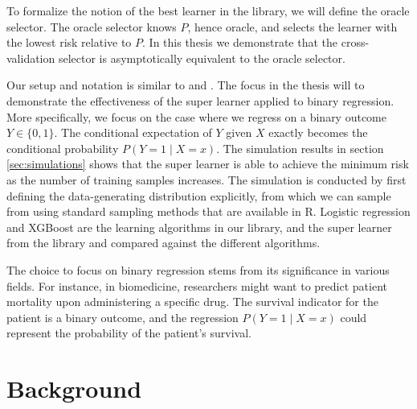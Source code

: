 \documentclass[11pt, a4paper]{article}
\theoremstyle{definition}
\theoremstyle{remark}
\begin{document}
To formalize the notion of the best learner in the library, we will define the oracle selector. The oracle selector knows $ P $, hence oracle, and selects the learner with the lowest risk relative to $ P $. In this thesis we demonstrate that the cross-validation selector is asymptotically equivalent to the oracle selector. 

Our setup and notation is similar to \cite{vaart06} and \cite{laan03}. The focus in the thesis will to demonstrate the effectiveness of the super learner applied to binary regression. More specifically, we focus on the case where we regress on a binary outcome $ Y \in \{0,1\} $. The conditional expectation of $ Y $ given $ X $ exactly becomes the conditional probability $ P(Y = 1 \mid X = x) $. The simulation results in section \ref{sec:simulations} shows that the super learner is able to achieve the minimum risk as the number of training samples increases. The simulation is conducted by first defining the data-generating distribution explicitly, from which we can sample from using standard sampling methods that are available in R. Logistic regression and XGBoost are the learning algorithms in our library, and the super learner from the library and compared against the different algorithms.  

The choice to focus on binary regression stems from its significance in various fields. For instance, in biomedicine, researchers might want to predict patient mortality upon administering a specific drug. The survival indicator for the patient is a binary outcome, and the regression $ P(Y = 1 \mid X = x) $ could represent the probability of the patient's survival. 

\section{Background}
\end{document}

